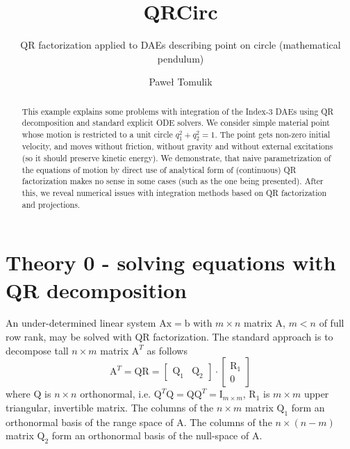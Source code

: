 \documentclass{scrartcl}
\title{QRCirc}
\subtitle{QR factorization applied to DAEs describing point on circle (mathematical pendulum)}
\author{Paweł Tomulik}
\newcommand\mMat[1]{\ensuremath{\boldsymbol{\mathrm{#1}}}}
\newcommand\mVec[1]{\ensuremath{\boldsymbol{\mathrm{#1}}}}
\begin{document}
\maketitle

\begin{abstract}
This example explains some problems with integration of the Index-3 DAEs using
QR decomposition and standard explicit ODE solvers. We consider simple material
point whose motion is restricted to a unit circle $q_1^2 + q_2^2 = 1$. The
point gets non-zero initial velocity, and moves without friction, without
gravity and without external excitations (so it should preserve kinetic
energy). We demonstrate, that naive parametrization of the equations of motion
by direct use of analytical form of (continuous) QR factorization makes no
sense in some cases (such as the one being presented). After this, we reveal
numerical issues with integration methods based on QR factorization and
projections.
\end{abstract}

\section{Theory 0 - solving equations with QR decomposition}

An under-determined linear system $\mMat{A}\mVec{x} = \mVec{b}$ with $m \times
n$ matrix $\mMat{A}$, $m < n$ of full row rank, may be solved with QR
factorization. The standard approach is to decompose tall $n \times m$ matrix
$\mMat{A}^T$ as follows
\begin{equation}
  \mMat{A}^T
= \mMat{Q} \mMat{R}
= \begin{bmatrix} \mMat{Q}_1 & \mMat{Q}_2 \end{bmatrix}
  \cdot
  \begin{bmatrix} \mMat{R}_1 \\  \mMat{0} \end{bmatrix}
  \label{eq:INYH}
\end{equation}
where  $\mMat{Q}$ is $n \times n$ orthonormal, i.e. $\mMat{Q}^T \mMat{Q} =
\mMat{Q}\mMat{Q}^T = \mMat{I}_{m \times m}$, $\mMat{R}_1$ is $m \times m$ upper
triangular, invertible matrix. The columns of the $n \times m$ matrix
$\mMat{Q}_1$ form an orthonormal basis of the range space of $\mMat{A}$. The
columns of the $n \times (n-m)$ matrix $\mMat{Q}_2$ form an orthonormal basis
of the null-space of $\mMat{A}$.
\end{document}
